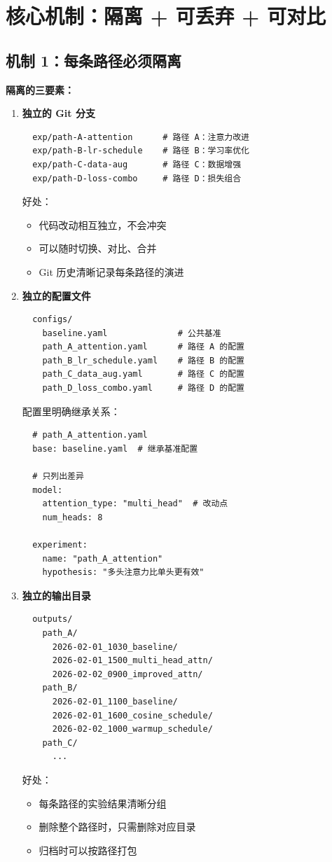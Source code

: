 \section{核心机制：隔离 + 可丢弃 + 可对比}

\subsection{机制 1：每条路径必须隔离}

\textbf{隔离的三要素：}

\begin{enumerate}
  \item \textbf{独立的 Git 分支}
  \begin{verbatim}
  exp/path-A-attention      # 路径 A：注意力改进
  exp/path-B-lr-schedule    # 路径 B：学习率优化
  exp/path-C-data-aug       # 路径 C：数据增强
  exp/path-D-loss-combo     # 路径 D：损失组合
  \end{verbatim}

  好处：
  \begin{itemize}
    \item 代码改动相互独立，不会冲突
    \item 可以随时切换、对比、合并
    \item Git 历史清晰记录每条路径的演进
  \end{itemize}

  \item \textbf{独立的配置文件}
  \begin{verbatim}
  configs/
    baseline.yaml              # 公共基准
    path_A_attention.yaml      # 路径 A 的配置
    path_B_lr_schedule.yaml    # 路径 B 的配置
    path_C_data_aug.yaml       # 路径 C 的配置
    path_D_loss_combo.yaml     # 路径 D 的配置
  \end{verbatim}

  配置里明确继承关系：
  \begin{verbatim}
  # path_A_attention.yaml
  base: baseline.yaml  # 继承基准配置

  # 只列出差异
  model:
    attention_type: "multi_head"  # 改动点
    num_heads: 8

  experiment:
    name: "path_A_attention"
    hypothesis: "多头注意力比单头更有效"
  \end{verbatim}

  \item \textbf{独立的输出目录}
  \begin{verbatim}
  outputs/
    path_A/
      2026-02-01_1030_baseline/
      2026-02-01_1500_multi_head_attn/
      2026-02-02_0900_improved_attn/
    path_B/
      2026-02-01_1100_baseline/
      2026-02-01_1600_cosine_schedule/
      2026-02-02_1000_warmup_schedule/
    path_C/
      ...
  \end{verbatim}

  好处：
  \begin{itemize}
    \item 每条路径的实验结果清晰分组
    \item 删除整个路径时，只需删除对应目录
    \item 归档时可以按路径打包
  \end{itemize}
\end{enumerate}

